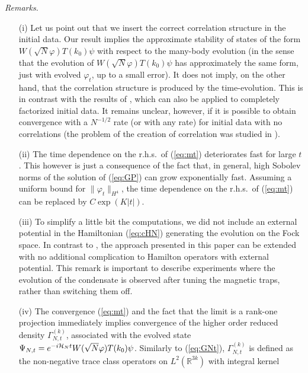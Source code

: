 \documentclass[11pt,a4paper]{article}
\newcommand{\bR}{{\mathbb R}}
\newcommand{\cH}{{\cal H}}
\begin{document}
{\it Remarks.}
\begin{itemize}
\item[(i)] Let us point out that we insert the correct correlation structure in the initial data. Our result implies the approximate stability of states of the form $W(\sqrt{N} \varphi) T(k_0) \psi$ with respect to the many-body evolution (in the sense that the evolution of $W(\sqrt{N} \varphi) T(k_0) \psi$ has approximately the same form, just with evolved $\varphi_t$, up to a small error). It does not imply, on the other hand, that the correlation structure is produced by the time-evolution. This is in contrast with the results of \cite{ESY1,ESY2,ESY3,ESY4}, which can also be applied to completely factorized initial data. It remains unclear, however, if it is possible to obtain convergence with a $N^{-1/2}$ rate (or with any rate) for initial data with 
no correlations (the problem of the creation of correlation was studied in \cite{EMS}). 
\item[(ii)] The time dependence on the r.h.s.\ of (\ref{eq:mt}) deteriorates fast for large $t$. This however is just a consequence of the fact that, in general, high Sobolev norms of the solution of (\ref{eq:GP}) can grow exponentially fast. Assuming a uniform bound for $\| \varphi_t \|_{H^4}$, the time dependence on the r.h.s.\ of (\ref{eq:mt}) can be replaced by $C \exp (K |t|)$. 
\item[(iii)] To simplify a little bit the computations, we did not include an external potential in the Hamiltonian (\ref{eq:cHN}) generating the evolution on the Fock space. In contrast to \cite{ESY1,ESY2,ESY3,ESY4}, the approach presented in this paper can be extended with no additional complication to Hamilton operators with external potential. This remark is important to describe experiments where the evolution of the condensate is observed after tuning the magnetic traps, rather than switching them off. 
\item[(iv)] The convergence (\ref{eq:mt}) and the fact that the limit is a rank-one projection immediately implies convergence of the higher order reduced density $\Gamma_{N,t}^{(k)}$, associated with the evolved state $\Psi_{N,t} = e^{-i\cH_N t} W(\sqrt{N} \varphi) T(k_0) \psi$. Similarly to (\ref{eq:GNt}), $\Gamma^{(k)}_{N,t}$ is defined as the non-negative trace class operators on $L^2 (\bR^{3k})$ with integral kernel

\end{itemize}
\end{document}
